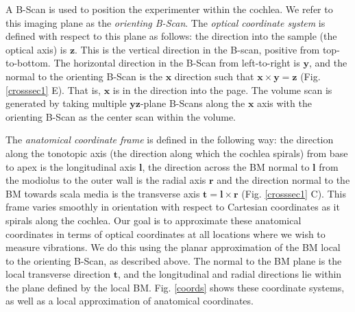 \documentclass[preprint,NumberedRefs]{JASA}
\begin{document}
\par{A B-Scan is used to position the experimenter within the cochlea. We refer to this imaging plane as the \textit{orienting B-Scan}. The \textit{optical coordinate system} is defined with respect to this plane as follows: the direction into the sample (the optical axis) is $\mathbf{z}$. This is the vertical direction in the B-scan, positive from top-to-bottom. The horizontal direction in the B-Scan from left-to-right is $\mathbf{y}$, and the normal to the orienting B-Scan is the $\mathbf{x}$ direction such that $\mathbf{x}\times \mathbf{y} = \mathbf{z}$ (Fig. \ref{crosssec1} E). That is, $\mathbf{x}$ is in the direction into the page. The volume scan is generated by taking multiple $\mathbf{yz}$-plane B-Scans along the $\mathbf{x}$ axis with the orienting B-Scan as the center scan within the volume.}
\par{The \textit{anatomical coordinate frame} is defined in the following way: the direction along the tonotopic axis (the direction along which the cochlea spirals) from base to apex is the longitudinal axis $\mathbf{l}$, the direction across the BM normal to $\mathbf{l}$ from the modiolus to the outer wall is the radial axis $\mathbf{r}$ and the direction normal to the BM towards scala media is the transverse axis $\mathbf{t}=\mathbf{l}\times\mathbf{r}$ (Fig. \ref{crosssec1} C). This frame varies smoothly in orientation with respect to Cartesian coordinates as it spirals along the cochlea.}
{Our goal is to approximate these anatomical coordinates in terms of optical coordinates at all locations where we wish to measure vibrations. We do this using the planar approximation of the BM local to the orienting B-Scan, as described above. The normal to the BM plane is the local transverse direction $\mathbf{t}$, and the longitudinal and radial directions lie within the plane defined by the local BM. Fig. \ref{coords} shows these coordinate systems, as well as a local approximation of anatomical coordinates.}
\end{document}
